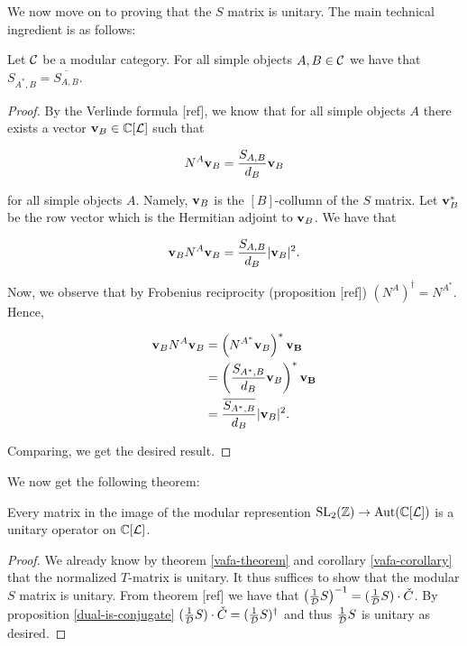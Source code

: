 We now move on to proving that the $S$ matrix is unitary. The main technical ingredient is as follows:

\begin{prop}\label{dual-is-conjugate} Let ${\mathcal C}$ be a modular category. For all simple objects $A,B\in {\mathcal C}$ we have that $S_{A^*,B}=\overline{S_{A,B}}$.
\end{prop}
\begin{proof} By the Verlinde formula [ref], we know that for all simple objects $A$ there exists a vector $\bold{v}_B\in {\mathbb C}[{\mathcal L}]$ such that

$$N^{A} \bold{v}_B= \frac{S_{A,B}}{d_B}\bold{v}_B$$

for all simple objects $A$. Namely, $\bold{v}_B$ is the $[B]$-collumn of the $S$ matrix. Let $\bold{v}_B^{*}$ be the row vector which is the Hermitian adjoint to $\bold{v}_B$. We have that

$$\bold{v}_{B}N^{A}\bold{v}_B=\frac{S_{A,B}}{d_B}|\bold{v}_B|^2.$$

Now, we observe that by Frobenius reciprocity (proposition [ref]) $(N^{A})^{\dagger}=N^{A^*}$. Hence,

\begin{align*}
\bold{v}_{B}N^{A}\bold{v}_B&=\left(N^{A^*}\bold{v}_B\right)^*\bold{v_B}\\
&=\left(\frac{S_{A^*,B}}{d_B}\bold{v}_B\right)^*\bold{v_B}\\
&=\frac{\overline{S_{A^*,B}}}{d_B}|\bold{v}_B|^2.
\end{align*}

Comparing, we get the desired result.

\end{proof}

We now get the following theorem:

\begin{thrm} Every matrix in the image of the modular represention $\operatorname{SL}_2({\mathbb Z})\to \operatorname{Aut}({\mathbb C}[{\mathcal L}])$ is a unitary operator on ${\mathbb C}[{\mathcal L}]$.
\end{thrm}
\begin{proof} We already know by theorem \ref{vafa-theorem} and corollary \ref{vafa-corollary} that the normalized $T$-matrix is unitary. It thus suffices to show that the modular $S$ matrix is unitary. From theorem [ref] we have that $\left(\frac{1}{{\mathcal D}}S\right)^{-1} = (\frac{1}{{\mathcal D}}S) \cdot {\check C}$. By proposition \ref{dual-is-conjugate} $(\frac{1}{{\mathcal D}}S) \cdot {\check C} = (\frac{1}{{\mathcal D}}S)^{\dagger}$ and thus $\frac{1}{{\mathcal D}}S$ is unitary as desired.
\end{proof}


